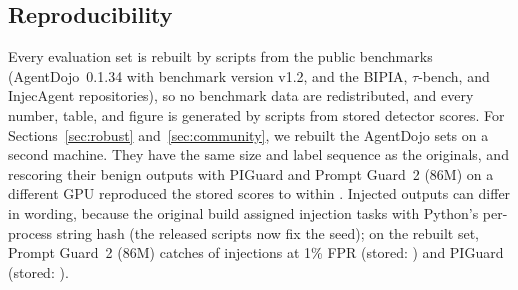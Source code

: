 \subsection{Reproducibility}
\label{sec:impl}
Every evaluation set is rebuilt by scripts from the public benchmarks (AgentDojo~0.1.34 with benchmark version v1.2, and the BIPIA, $\tau$-bench, and InjecAgent repositories), so no benchmark data are redistributed, and every number, table, and figure is generated by scripts from stored detector scores. For Sections~\ref{sec:robust} and~\ref{sec:community}, we rebuilt the AgentDojo sets on a second machine. They have the same size and label sequence as the originals, and rescoring their benign outputs with PIGuard and Prompt Guard~2 (86M) on a different GPU reproduced the stored scores to within \ReproMaxDiff. Injected outputs can differ in wording, because the original build assigned injection tasks with Python's per-process string hash (the released scripts now fix the seed); on the rebuilt set, Prompt Guard~2 (86M) catches \PGtRebuiltTpr of injections at 1\% FPR (stored: \MPGtAD) and PIGuard \PGRebuiltTpr (stored: \ADPGTpr).
